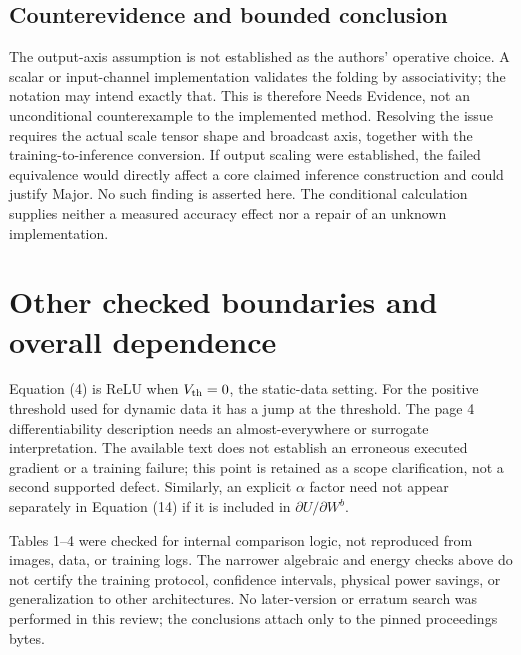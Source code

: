 \documentclass[10pt]{article}
\begin{document}
\subsection*{Counterevidence and bounded conclusion}
The output-axis assumption is not established as the authors’ operative choice. A scalar or input-channel implementation validates the folding by associativity; the notation may intend exactly that. This is therefore Needs Evidence, not an unconditional counterexample to the implemented method. Resolving the issue requires the actual scale tensor shape and broadcast axis, together with the training-to-inference conversion. If output scaling were established, the failed equivalence would directly affect a core claimed inference construction and could justify Major. No such finding is asserted here. The conditional calculation supplies neither a measured accuracy effect nor a repair of an unknown implementation.\par
\section*{Other checked boundaries and overall dependence}
Equation (4) is ReLU when \(V_{\rm th}=0\), the static-data setting. For the positive threshold used for dynamic data it has a jump at the threshold. The page 4 differentiability description needs an almost-everywhere or surrogate interpretation. The available text does not establish an erroneous executed gradient or a training failure; this point is retained as a scope clarification, not a second supported defect. Similarly, an explicit \(\alpha\) factor need not appear separately in Equation (14) if it is included in \(\partial U/\partial W^b\).\par
Tables 1–4 were checked for internal comparison logic, not reproduced from images, data, or training logs. The narrower algebraic and energy checks above do not certify the training protocol, confidence intervals, physical power savings, or generalization to other architectures. No later-version or erratum search was performed in this review; the conclusions attach only to the pinned proceedings bytes.\par
\end{document}
